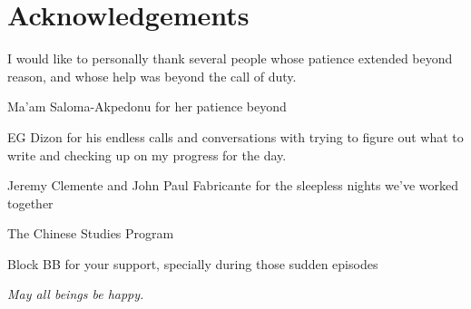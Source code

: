 \chapter*{Acknowledgements}

I would like to personally thank several people whose patience extended beyond
reason, and whose help was beyond the call of duty.

Ma'am Saloma-Akpedonu for her patience beyond

EG Dizon for his endless calls and conversations with trying to figure out what
to write and checking up on my progress for the day.

Jeremy Clemente and John Paul Fabricante for the sleepless nights we've worked
together

The Chinese Studies Program

Block BB for your support, specially during those sudden episodes

\textit{May all beings be happy.}

